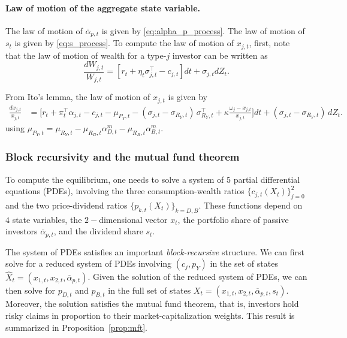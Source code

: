 \paragraph{Law of motion of the aggregate state variable.}
The law of motion of $\overline{\alpha}_{p,t}$ is given by \eqref{eq:alpha_p_process}.
The law of motion of $s_t$ is given by \eqref{eq:s_process}.
To compute the law of motion of $x_{j,t}$, first, note that the law of motion of wealth for a type-$j$ investor can be written as
\begin{equation}
    \frac{d W_{j,t}}{W_{j,t}} = \left[ r_t + \eta_t \sigma_{j,t}^\top - c_{j,t} \right]dt + \sigma_{j,t} d Z_t.
\end{equation}

From Ito's lemma, the law of motion of $x_{j,t}$ is given by
\begin{align*}
    \frac{dx_{j,t}}{x_{j,t}} 
    &= \Big[ r_t + \pi_t^\top \alpha_{j,t} - c_{j,t} - \mu_{P_Y,t} 
        - (\sigma_{j,t} - \sigma_{R_Y,t}) \, \sigma_{R_Y,t}^\top 
        + \kappa \frac{\omega_j - x_{j,t}}{x_{j,t}} \Big] dt  
        + (\sigma_{j,t} - \sigma_{R_Y,t}) \, dZ_t.
\end{align*}
using $\mu_{P_Y,t} = \mu_{R_Y,t} - \mu_{R_D,t} \alpha_{D,t}^m - \mu_{R_B,t} \alpha_{B,t}^m$.


\subsubsection{Block recursivity and the mutual fund theorem}

To compute the equilibrium, one needs to solve a system of $5$ partial differential equations (PDEs), involving the three consumption-wealth ratios $\{c_{j,t}(X_t)\}_{j=0}^2$ and the two price-dividend ratios $\{p_{k,t}(X_t)\}_{k=D,B}$. %
These functions depend on $4$ state variables, the $2-$dimensional vector $x_{t}$, the portfolio share of passive investors $\overline{\alpha}_{p,t}$, and the dividend share $s_t$.

The system of PDEs satisfies an important \textit{block-recursive} structure.
We can first solve for a reduced system of PDEs involving $(c_j,p_Y)$ in the set of states $\hat{X}_t = (x_{1,t}, x_{2,t}, \overline{\alpha}_{p,t})$.
Given the solution of the reduced system of PDEs, we can then solve for $p_{D,t}$ and $p_{B,t}$ in the full set of states $X_t = (x_{1,t}, x_{2,t}, \overline{\alpha}_{p,t}, s_t)$. 
Moreover, the solution satisfies the mutual fund theorem, that is, investors hold risky claims in proportion to their market-capitalization weights.
This result is summarized in Proposition~\ref{prop:mft}.

